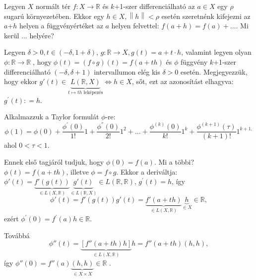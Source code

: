 \documentclass[12pt,a4paper]{scrartcl}
\begin{document}
Legyen \(X\) normált tér \(\left. f:X\rightarrow{\mathbb{R}} \right.\)
és \(k\)+1-szer differenciálható az \(a \in X\) egy \(\rho\) sugarú
környezetében. Ekkor egy \(h \in X,\left\| h \right\| < \rho\) esetén
szeretnénk kifejezni az \(a\)+\(h\) helyen a függvényértéket az \(a\)
helyen felvettel:
\(f\left( {a + h} \right) = f\left( a \right) + \ldots\). Mi kerül ...
helyére?

Legyen \(\delta > 0,t \in \left( {- \delta,1 + \delta} \right)\),
\(\left. g:{\mathbb{R}}\rightarrow X,g\left( t \right) = a + t \cdot h \right.\),
valamint legyen olyan
\(\left. \phi:{\mathbb{R}}\rightarrow{\mathbb{R}}\operatorname{,\ hogy}\phi\left( t \right) = \left( {f \circ g} \right)\left( t \right) = f\left( {a + th} \right) \right.\)
és \(\phi\) függvény \(k\)+1-szer differenciálható
\(\left( {- \delta,\delta + 1} \right)\) intervallumon elég kis
\(\delta > 0\) esetén. Megjegyezzük, hogy ekkor
\(g'\left( t \right) \in \underbrace {L\left( {\mathbb{R},X} \right)}_{t \mapsto th{\text{ leképezés}}} \Leftrightarrow h \in X\),
sőt, ezt az azonosítást elhagyva: \(g^{\prime}\left( t \right): = h\).

Alkalmazzuk a Taylor formulát \(\phi\)-re:
\[\phi\left( 1 \right) = \phi\left( 0 \right) + \frac{\phi^{\prime}\left( 0 \right)}{1!}1 + \frac{\phi^{''}\left( 0 \right)}{2!}1^{2} + ... + \frac{\phi^{(k)}\left( 0 \right)}{k!}1^{k} + \frac{\phi^{({k + 1})}\left( \tau \right)}{\left( {k + 1} \right)!}1^{k + 1,}\]
ahol \(0 < \tau < 1\).

Ennek első tagjáról tudjuk, hogy
\(\phi\left( 0 \right) = f\left( a \right)\). Mi a többi?
\(\phi\left( t \right) = f\left( {a + th} \right)\), illetve
\(\phi = f \circ g\). Ekkor a deriváltja:
\(\phi '\left( t \right) = \underbrace {f'\left( {g\left( t \right)} \right)}_{ \in L\left( {X,\mathbb{R}} \right)}\underbrace {g'\left( t \right)}_{ \in L\left( {\mathbb{R},X} \right)} \in L\left( {\mathbb{R},\mathbb{R}} \right)\),
\(g^{\prime}\left( t \right) = h\), így
\[\phi '\left( t \right) = f'\left( {g\left( t \right)} \right)g'\left( t \right) = \underbrace {f'\left( {a + th} \right)}_{ \in L\left( {X,\mathbb{R}} \right)}\underbrace h_{ \in X} \in \mathbb{R},\]
ezért
\(\phi^{\prime}\left( 0 \right) = f^{\prime}\left( a \right)h \in {\mathbb{R}}\).

Továbbá
\[\phi ''\left( t \right) = \underbrace {\left[ {f''\left( {a + th} \right)h} \right]}_{ \in L\left( {X,\mathbb{R}} \right)}h = f''\left( {a + th} \right)\left( {h,h} \right),\]
így
\(\phi ''\left( 0 \right) = f''\left( a \right)\underbrace {\left( {h,h} \right)}_{ \in X \times X} \in \mathbb{R}\)
.
\end{document}
